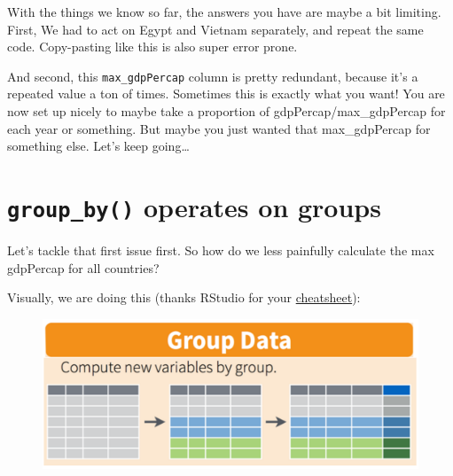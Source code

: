 \documentclass[]{book}
\newenvironment{Shaded}{\begin{snugshade}}{\end{snugshade}}
\newcommand{\KeywordTok}[1]{\textcolor[rgb]{0.13,0.29,0.53}{\textbf{{#1}}}}
\newcommand{\DataTypeTok}[1]{\textcolor[rgb]{0.13,0.29,0.53}{{#1}}}
\newcommand{\StringTok}[1]{\textcolor[rgb]{0.31,0.60,0.02}{{#1}}}
\newcommand{\CommentTok}[1]{\textcolor[rgb]{0.56,0.35,0.01}{\textit{{#1}}}}
\newcommand{\NormalTok}[1]{{#1}}
\theoremstyle{definition}
\theoremstyle{definition}
\theoremstyle{definition}
\theoremstyle{remark}
\begin{document}
With the things we know so far, the answers you have are maybe a bit
limiting. First, We had to act on Egypt and Vietnam separately, and
repeat the same code. Copy-pasting like this is also super error prone.

And second, this \texttt{max\_gdpPercap} column is pretty redundant,
because it's a repeated value a ton of times. Sometimes this is exactly
what you want! You are now set up nicely to maybe take a proportion of
gdpPercap/max\_gdpPercap for each year or something. But maybe you just
wanted that max\_gdpPercap for something else. Let's keep going\ldots{}

\section{\texorpdfstring{\texttt{group\_by()} operates on
groups}{group\_by() operates on groups}}\label{group_by-operates-on-groups}

Let's tackle that first issue first. So how do we less painfully
calculate the max gdpPercap for all countries?

Visually, we are doing this (thanks RStudio for your
\href{http://www.rstudio.com/wp-content/uploads/2015/02/data-wrangling-cheatsheet.pdf}{cheatsheet}):

\begin{figure}[htbp]
\centering
\includegraphics{img/rstudio-cheatsheet-group_by.png}
\caption{}
\end{figure}

\begin{Shaded}
\end{Shaded}
\end{document}
